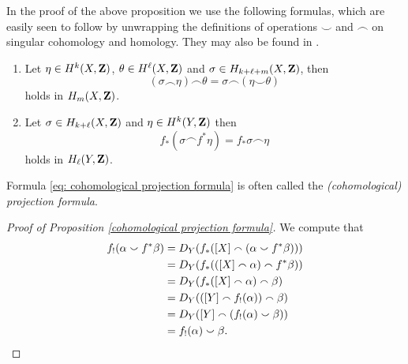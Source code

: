 \begin{remark}
    In the proof of the above proposition we use the following formulas, which are easily seen to follow by unwrapping the definitions of operations $\smallsmile$ and $\smallfrown$ on singular cohomology and homology. They may also be found in \cite[\S VI, Theorem 5.2]{Bredon1993}.
    \begin{enumerate}[label = (\roman*)]
        \item{Let $\eta \in H^{k}(X, \mathbf Z)$, $\theta \in H^{\ell}(X, \mathbf Z)$ and $\sigma \in H_{k+\ell+m}(X, \mathbf Z)$, then 
        \[
            (\sigma \smallfrown \eta) \smallfrown \theta = 
            \sigma \smallfrown (\eta \smallsmile \theta)
        \]
        holds in $H_m(X, \mathbf Z)$.}
        \item{Let $\sigma \in H_{k + \ell}(X, \mathbf Z)$ and $\eta \in H^{k}(Y, \mathbf Z)$ then 
        \[
            f_*(\sigma \smallfrown f^*\eta) = f_*\sigma \smallfrown \eta
        \]
        holds in $H_\ell(Y, \mathbf Z)$.
        }
    \end{enumerate}
    Formula \eqref{eq: cohomological projection formula} is often called the \emph{(cohomological) projection formula}.
\end{remark}

\begin{proof}[Proof of Proposition \ref{cohomological projection formula}]
    We compute that
    \begin{align*}
        f_!(\alpha \smallsmile f^*\beta) &=
        D_Y(f_*([X] \smallfrown (\alpha \smallsmile f^*\beta))) \\
        &= D_Y(f_*(([X] \smallfrown \alpha) \smallfrown f^*\beta)) \\
        &= D_Y(f_*([X] \smallfrown \alpha) \smallfrown \beta) \\
        &= D_Y(([Y] \smallfrown f_!(\alpha)) \smallfrown \beta) \\
        &= D_Y([Y] \smallfrown (f_!(\alpha) \smallsmile \beta)) \\
        &= f_!(\alpha) \smallsmile \beta. \qedhere
    \end{align*}
\end{proof}

